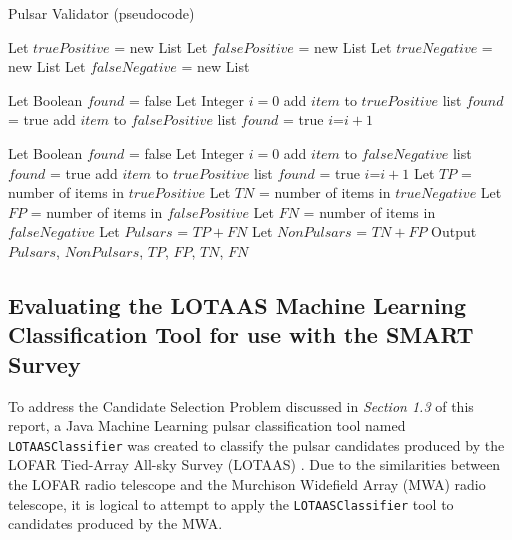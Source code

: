 \documentclass{article}
\begin{document}
\begin{algorithm}
    \caption{Pulsar Validator (pseudocode)}
    \label{alg:validator}
    \begin{algorithmic}
        \State Let $truePositive$ = new List
        \State Let $falsePositive$ = new List
        \State Let $trueNegative$ = new List
        \State Let $falseNegative$ = new List
        
            \State Let Boolean $found$ = false
            \State Let Integer $i=0$
                    \State add $item$ to $truePositive$ list
                    \State $found$ = true
                    \State add $item$ to $falsePositive$ list
                    \State $found$ = true
                \Else
                    \State $i$=$i+1$
                \EndIf
            \EndWhile
        \EndFor

            \State Let Boolean $found$ = false
            \State Let Integer $i=0$
                    \State add $item$ to $falseNegative$ list
                    \State $found$ = true
                    \State add $item$ to $truePositive$ list
                    \State $found$ = true
                \Else
                    \State $i$=$i+1$
                \EndIf
            \EndWhile
        \EndFor
        \State Let $TP$ = number of items in $truePositive$
        \State Let $TN$ = number of items in $trueNegative$
        \State Let $FP$ = number of items in $falsePositive$
        \State Let $FN$ = number of items in $falseNegative$
        \State Let $Pulsars$ = $TP+FN$
        \State Let $NonPulsars$ = $TN+FP$
        \State Output $Pulsars$, $NonPulsars$, $TP$, $FP$, $TN$, $FN$
    \end{algorithmic}
\end{algorithm}

\subsection{Evaluating the LOTAAS Machine Learning Classification Tool for use with the SMART Survey}

To address the Candidate Selection Problem discussed in \emph{Section 1.3} of this report, a Java Machine Learning pulsar classification tool named \verb|LOTAASClassifier| was created to classify the pulsar candidates produced by the LOFAR Tied-Array All-sky Survey (LOTAAS) \autocite{lyon}. Due to the similarities between the LOFAR radio telescope and the Murchison Widefield Array (MWA) radio telescope, it is logical to attempt to apply the \verb|LOTAASClassifier| tool to candidates produced by the MWA.
\end{document}

